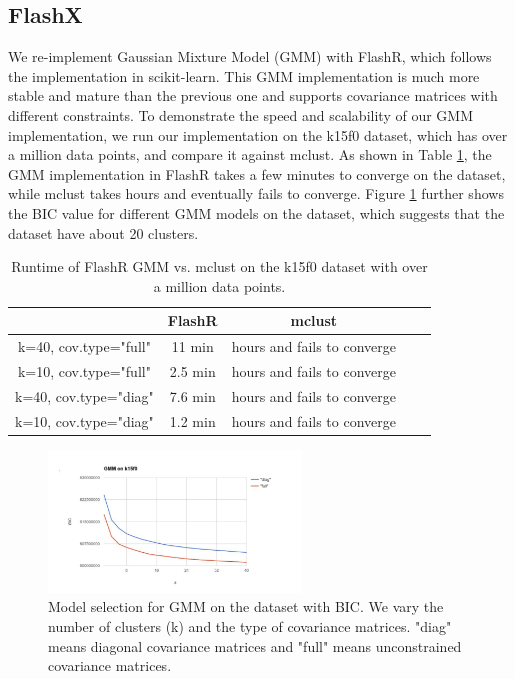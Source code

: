 \documentclass[simplex.tex]{subfiles}
\begin{document}
\subsection{FlashX}

We re-implement Gaussian Mixture Model (GMM) with FlashR, which follows
the implementation in scikit-learn. This GMM implementation is much more
stable and mature than the previous one and supports covariance matrices
with different constraints. To demonstrate the speed and scalability of
our GMM implementation, we run our implementation on the k15f0 dataset,
which has over a million data points, and compare it against mclust.
As shown in Table \ref{tbl:GMM}, the GMM implementation in FlashR takes
a few minutes to converge on the dataset, while mclust takes hours and
eventually fails to converge. Figure \ref{fig:GMM} further shows
the BIC value for different GMM models on the dataset, which suggests
that the dataset have about 20 clusters.

\begin{table}[!ht]
\begin{center}
\caption{Runtime of FlashR GMM vs. mclust on the k15f0 dataset with over
a million data points.}
\vspace{-10pt}
\footnotesize
\begin{tabular}{|c|c|c|c|c|}
\hline
& FlashR & mclust \\
\hline
k=40, cov.type="full" & 11 min & hours and fails to converge \\
\hline
k=10, cov.type="full" & 2.5 min & hours and fails to converge \\
\hline
k=40, cov.type="diag" & 7.6 min & hours and fails to converge \\
\hline
k=10, cov.type="diag" & 1.2 min & hours and fails to converge \\
\hline
\end{tabular}
\normalsize
\label{tbl:GMM}
\end{center}
\vspace{-10pt}
\end{table}

\begin{figure}[!h]
\begin{cframed}
\centering
\includegraphics[width=0.6\textwidth]{../../figs/GMM.jpg}
\caption{Model selection for GMM on the dataset with BIC. We vary
the number of clusters (k) and the type of covariance matrices.
"diag" means diagonal covariance matrices and "full" means unconstrained
covariance matrices.}
\label{fig:GMM}
\end{cframed}
\end{figure}

\clearpage
\end{document}
